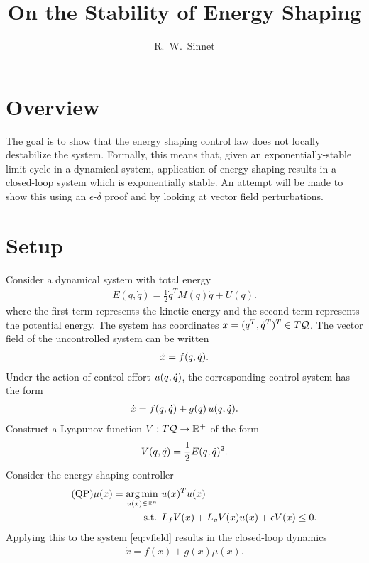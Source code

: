 \documentclass[twocolumn]{article}
\author{R.~W.~Sinnet}
\title{On the Stability of Energy Shaping}
\begin{document}
\maketitle

\section*{Overview}
The goal is to show that the energy shaping control law does not locally destabilize the system.
%
Formally, this means that, given an exponentially-stable limit cycle in a dynamical system, application of energy shaping results in a closed-loop system which is exponentially stable.
%
An attempt will be made to show this using an $\epsilon$-$\delta$ proof and by looking at vector field perturbations.

\section{Setup}

Consider a dynamical system with total energy
\begin{align*}
  E(q, \dot q) = \frac{1}{2} {\dot q}^{T} M(q) {\dot q} + U(q).
\end{align*}
where the first term represents the kinetic energy and the second term represents the potential energy.
%
The system has coordinates $x = (q^T, \dot{q}^T)^T \in T\mathcal{Q}$.
%
The vector field of the uncontrolled system can be written
\begin{align}
  {\dot x} = f(q, \dot{q}).
  \label{eq:vfield}
\end{align}
Under the action of control effort $u(q, \dot{q})$, the corresponding control system has the form
\begin{align}
  {\dot x} = f(q, \dot{q}) + g(q) \, u(q, \dot{q}).
  \label{eq:csys}
\end{align}
Construct a Lyapunov function $V : T\mathcal{Q} \to \mathbb{R}^{+}$ of the form
\begin{align}
  \label{eq:lyap}
  V(q, \dot{q}) = \frac{1}{2} E(q, \dot{q})^2.
\end{align}
Consider the energy shaping controller
\begin{align}
  \label{eq:es-qp} \tag {QP}
  \mu(x) = \operatorname*{arg\,min}_{u(x) \in \mathbb{R}^{n}} \ & u(x)^T u(x)\\
  \nonumber
  \mbox{s.t. } & L_{f} V(x) + L_{g} V(x) u(x) + \epsilon V(x) \leq 0.
\end{align}
Applying this to the system \eqref{eq:vfield} results in the closed-loop dynamics
\begin{align}
  \label{eq:vfield-cl}
  {\dot x} = f(x) + g(x) \mu(x).
\end{align}
\end{document}
